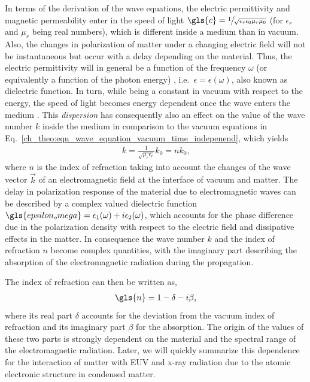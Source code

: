 In terms of the derivation of the wave equations, the electric permittivity and magnetic permeability enter in the speed of light $\gls{c} = \sfrac{1}{\sqrt{\epsilon_r \epsilon_0 \mu_r \mu_0}}$ (for $\epsilon_r$ and $\mu_r$ being real numbers), which is different inside a medium than in vacuum. Also, the changes in polarization of matter under a changing electric field will not be instantaneous but occur with a delay depending on the material. Thus, the electric permittivity will in general be a function of the frequency $\omega$ (or equivalently a function of the photon energy) , i.e.~$\epsilon = \epsilon(\omega)$, also known as dielectric function. In turn, while being a constant in vacuum with respect to the energy, the speed of light becomes energy dependent once the wave enters the medium \cite{bergevin_interaction_2009}. This \emph{dispersion} has consequently also an effect on the value of the wave number $k$ inside the medium in comparison to the vacuum equations in Eq.~\eqref{ch_theo:eqn_wave_equation_vacuum_time_indepenend}, which yields
\begin{align}
 k = \frac{1}{\sqrt{\mu_r \epsilon_r}} k_0 = n k_0\text{,} \label{ch_theo:eqn_k_inside_medium}
\end{align}
where $n$ is the index of refraction taking into account the changes of the wave vector $\vec{k}$ of an electromagnetic field at the interface of vacuum and matter. The delay in polarization response of the material due to electromagnetic waves can be described by a complex valued dielectric function $\gls{epsilon_omega} = \epsilon_1(\omega) + i \epsilon_2(\omega)$, which accounts for the phase difference due in the polarization density with respect to the electric field and dissipative effects in the matter. In consequence the wave number $k$ and the index of refraction $n$ become complex quantities, with the imaginary part describing the absorption of the electromagnetic radiation during the propagation.

The index of refraction can then be written as,
\begin{align}
\gls{n} = 1 - \delta - i \beta \text{,} \label{ch_theo:eqn_n}
\end{align}
where its real part $\delta$ accounts for the deviation from the vacuum index of refraction and its imaginary part $\beta$ for the absorption. The origin of the values of these two parts is strongly dependent on the material and the spectral range of the electromagnetic radiation. Later, we will quickly summarize this dependence for the interaction of matter with EUV and x-ray radiation due to the atomic electronic structure in condensed matter.

